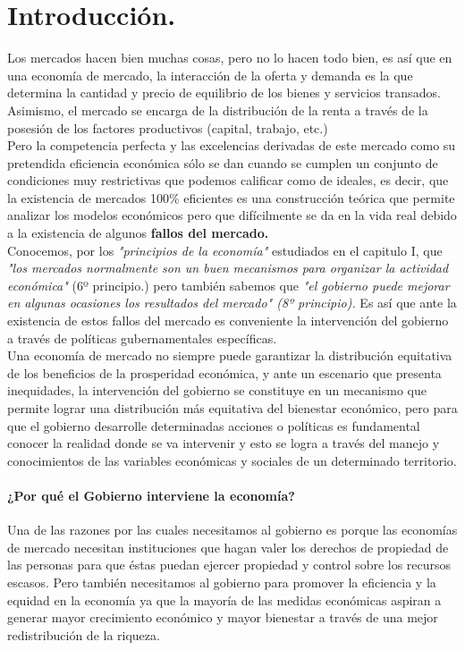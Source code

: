 \section{Introducción.}
Los mercados hacen bien muchas cosas, pero no lo hacen todo bien, es así que en una economía de mercado, la interacción de la oferta y demanda es la que determina la cantidad y precio de equilibrio de los bienes y servicios transados. Asimismo, el mercado se encarga de la distribución de la renta a través de la posesión de los factores productivos (capital, trabajo, etc.) \\

Pero la competencia perfecta y las excelencias derivadas de este mercado como su pretendida eficiencia económica sólo se dan cuando se cumplen un conjunto de condiciones muy restrictivas que podemos calificar como de ideales, es decir, que la existencia de mercados 100\% eficientes es una construcción teórica que permite analizar los modelos económicos pero que difícilmente se da en la vida real debido a la existencia de algunos \textbf{fallos del mercado.}\\

Conocemos, por los \textit{"principios de la economía"} estudiados en el capitulo I, que \textit{"los mercados normalmente son un buen mecanismos para organizar la actividad económica"} (6º principio.) pero también sabemos que \textit{"el gobierno puede mejorar en algunas ocasiones los resultados del mercado" (8º principio).} Es así que ante la existencia de estos fallos del mercado es conveniente la intervención del gobierno a través de políticas gubernamentales específicas.\\

Una economía de mercado no siempre puede garantizar la distribución equitativa de los beneficios de la prosperidad económica, y ante un escenario que presenta inequidades, la intervención del gobierno se constituye en un mecanismo que permite lograr una distribución más equitativa del bienestar económico, pero para que el gobierno desarrolle determinadas acciones o políticas es fundamental conocer la realidad donde se va intervenir y esto se logra a través del manejo y conocimientos de las variables económicas y sociales de un determinado territorio.   
\begin{scaja}
	\paragraph{¿Por qué el Gobierno interviene la economía?}
	Una de las razones por las cuales necesitamos al gobierno es porque las economías de mercado necesitan instituciones que hagan
	valer los derechos de propiedad de las personas para que éstas puedan ejercer propiedad y control sobre los recursos escasos. Pero también necesitamos al gobierno para promover la eficiencia y la equidad en la economía ya que la mayoría de las medidas económicas aspiran a generar mayor crecimiento económico y mayor bienestar a través de una mejor redistribución de la riqueza.
\end{scaja}

